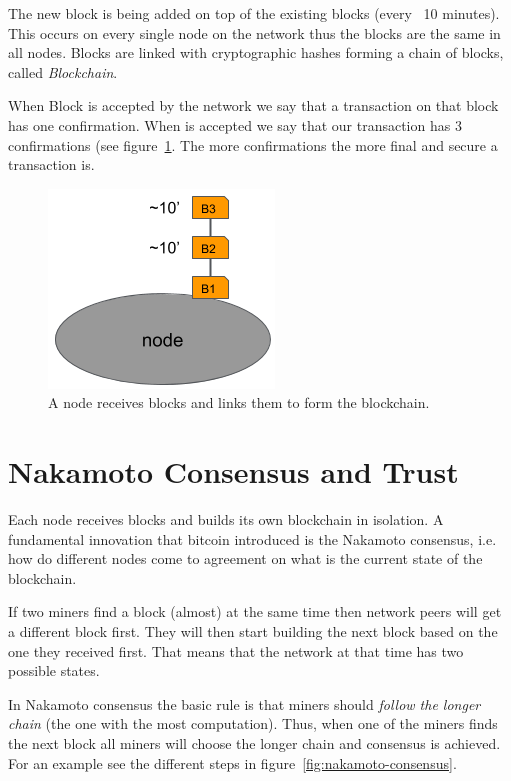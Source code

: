 The new block is being added on top of the existing blocks (every ~10 minutes). This occurs on every single node on the network thus the blocks are the same in all nodes. Blocks are linked with cryptographic hashes forming a chain of blocks, called \emph{Blockchain}.

When Block  is accepted by the network we say that a transaction on that block has one confirmation. When  is accepted we say that our transaction has 3 confirmations (see figure~\ref{fig:node-perspective-2}. The more confirmations the more final and secure a transaction is. 

\begin{figure}[h]
\begin{center}
\includegraphics[scale=0.5]{images/node-perspective-2}
\caption{A node receives blocks and links them to form the blockchain.}
\label{fig:node-perspective-2}
\end{center}
\end{figure}


\section{Nakamoto Consensus and Trust}
Each node receives blocks and builds its own blockchain in isolation. A fundamental innovation that bitcoin introduced is the Nakamoto consensus, i.e. how do different nodes come to agreement on what is the current state of the blockchain.

If two miners find a block (almost) at the same time then network peers will get a different block first. They will then start building the next block based on the one they received first. That means that the network at that time has two possible states.

In Nakamoto consensus the basic rule is that miners should \emph{follow the longer chain} (the one with the most computation). Thus, when one of the miners finds the next block all miners will choose the longer chain and consensus is achieved. For an example see the different steps in figure~\ref{fig:nakamoto-consensus}.

